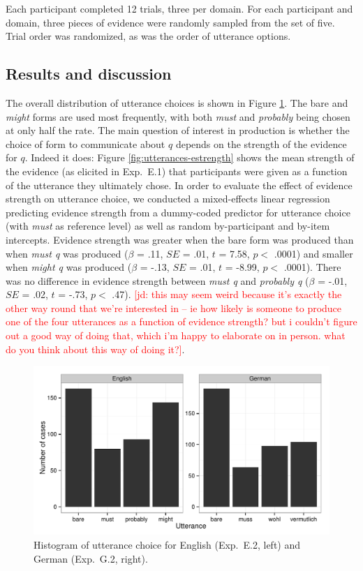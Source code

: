 \documentclass[11pt]{article}
\newcommand{\jd}[1]{\textcolor{Red}{[jd: #1]}}
\newcommand{\figref}[1]{Figure \ref{#1}}
\begin{document}
Each participant completed 12 trials, three per domain. For each participant and domain, three pieces of evidence were randomly sampled from the set of five. Trial order was randomized, as was the order of utterance options.

\subsection{Results and discussion}

The overall distribution of utterance choices is shown in \figref{fig:utterances}. The bare and \emph{might} forms are used most frequently, with both \emph{must} and \emph{probably} being chosen at only half the rate. The main question of interest in production is whether the choice of form to communicate about $q$ depends on the strength of the evidence for $q$. Indeed it does: \figref{fig:utterances-estrength} shows the mean strength of the evidence (as elicited in Exp.~E.1) that participants were given as a function of the utterance they ultimately chose.   In order to evaluate the effect of evidence strength on utterance choice, we conducted a mixed-effects linear regression predicting evidence strength from a dummy-coded predictor for utterance choice (with \emph{must} as reference level) as well as random by-participant and by-item  intercepts. Evidence strength was greater when the bare form was produced than when \emph{must q} was produced ($\beta$ = .11, $SE$ = .01, $t$ = 7.58, $p <$ .0001) and smaller when \emph{might q} was produced  ($\beta$ = -.13, $SE$ = .01, $t$ = -8.99, $p <$ .0001). There was no difference in evidence strength between \emph{must q} and \emph{probably q}  ($\beta$ = -.01, $SE$ = .02, $t$ = -.73, $p <$ .47). \jd{this may seem weird because it's exactly the other way round that we're interested in -- ie how likely is someone to produce one of the four utterances as a function of evidence strength? but i couldn't figure out a good way of doing that, which i'm happy to elaborate on in person. what do you think about this way of doing it?}.

\begin{figure}
\centering
\includegraphics[width=.9\textwidth]{pics/production-distribution}
\caption{Histogram of utterance choice for English (Exp.~E.2, left) and German (Exp.~G.2, right).}
\label{fig:utterances}
\end{figure}
\end{document}
